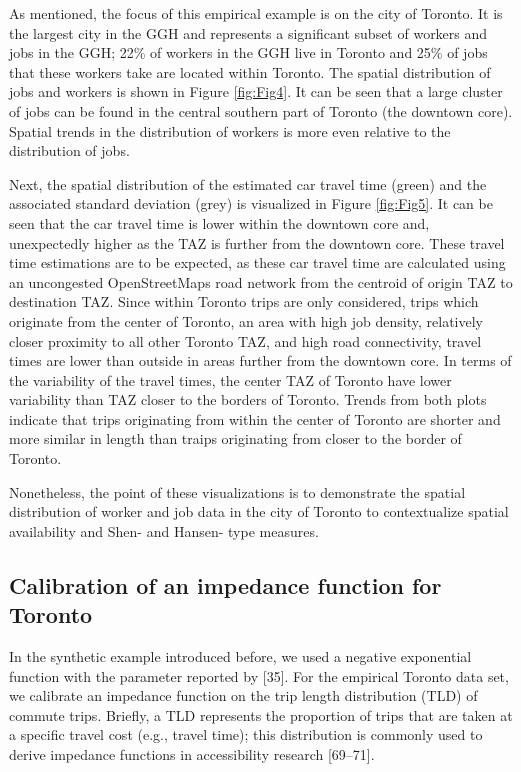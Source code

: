 \documentclass[10pt,letterpaper]{article}
\begin{document}
As mentioned, the focus of this empirical example is on the city of
Toronto. It is the largest city in the GGH and represents a significant
subset of workers and jobs in the GGH; 22\% of workers in the GGH live
in Toronto and 25\% of jobs that these workers take are located within
Toronto. The spatial distribution of jobs and workers is shown in Figure
\ref{fig:Fig4}. It can be seen that a large cluster of jobs can be found
in the central southern part of Toronto (the downtown core). Spatial
trends in the distribution of workers is more even relative to the
distribution of jobs.

Next, the spatial distribution of the estimated car travel time (green)
and the associated standard deviation (grey) is visualized in Figure
\ref{fig:Fig5}. It can be seen that the car travel time is lower within
the downtown core and, unexpectedly higher as the TAZ is further from
the downtown core. These travel time estimations are to be expected, as
these car travel time are calculated using an uncongested OpenStreetMaps
road network from the centroid of origin TAZ to destination TAZ. Since
within Toronto trips are only considered, trips which originate from the
center of Toronto, an area with high job density, relatively closer
proximity to all other Toronto TAZ, and high road connectivity, travel
times are lower than outside in areas further from the downtown core. In
terms of the variability of the travel times, the center TAZ of Toronto
have lower variability than TAZ closer to the borders of Toronto. Trends
from both plots indicate that trips originating from within the center
of Toronto are shorter and more similar in length than traips
originating from closer to the border of Toronto.

Nonetheless, the point of these visualizations is to demonstrate the
spatial distribution of worker and job data in the city of Toronto to
contextualize spatial availability and Shen- and Hansen- type measures.

\hypertarget{calibration-of-an-impedance-function-for-toronto}{%
\subsection{Calibration of an impedance function for
Toronto}\label{calibration-of-an-impedance-function-for-toronto}}

In the synthetic example introduced before, we used a negative
exponential function with the parameter reported by {[}35{]}. For the
empirical Toronto data set, we calibrate an impedance function on the
trip length distribution (TLD) of commute trips. Briefly, a TLD
represents the proportion of trips that are taken at a specific travel
cost (e.g., travel time); this distribution is commonly used to derive
impedance functions in accessibility research {[}69--71{]}.
\end{document}

